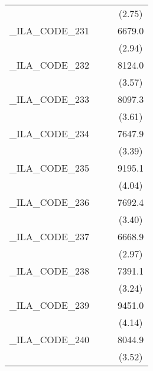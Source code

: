{\begin{tabular}{l*{3}{c}}
            &                     &                     &      (2.75)         \\
[1em]
\_ILA\_CODE\_231&                     &                     &      6679.0\sym{**} \\
            &                     &                     &      (2.94)         \\
[1em]
\_ILA\_CODE\_232&                     &                     &      8124.0\sym{***}\\
            &                     &                     &      (3.57)         \\
[1em]
\_ILA\_CODE\_233&                     &                     &      8097.3\sym{***}\\
            &                     &                     &      (3.61)         \\
[1em]
\_ILA\_CODE\_234&                     &                     &      7647.9\sym{***}\\
            &                     &                     &      (3.39)         \\
[1em]
\_ILA\_CODE\_235&                     &                     &      9195.1\sym{***}\\
            &                     &                     &      (4.04)         \\
[1em]
\_ILA\_CODE\_236&                     &                     &      7692.4\sym{***}\\
            &                     &                     &      (3.40)         \\
[1em]
\_ILA\_CODE\_237&                     &                     &      6668.9\sym{**} \\
            &                     &                     &      (2.97)         \\
[1em]
\_ILA\_CODE\_238&                     &                     &      7391.1\sym{**} \\
            &                     &                     &      (3.24)         \\
[1em]
\_ILA\_CODE\_239&                     &                     &      9451.0\sym{***}\\
            &                     &                     &      (4.14)         \\
[1em]
\_ILA\_CODE\_240&                     &                     &      8044.9\sym{***}\\
            &                     &                     &      (3.52)         \\

\end{tabular}}

